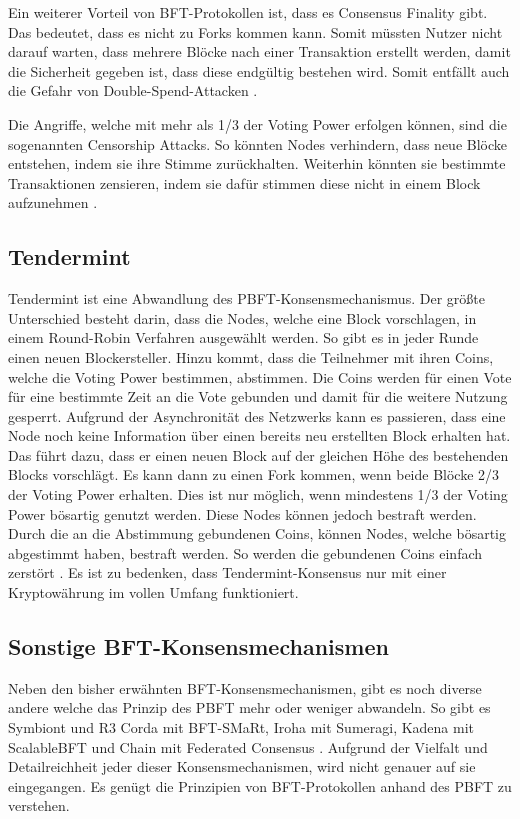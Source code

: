 Ein weiterer Vorteil von BFT-Protokollen ist, dass es Consensus Finality gibt. Das bedeutet, dass es nicht zu Forks kommen kann. Somit müssten Nutzer nicht darauf warten, dass mehrere Blöcke nach einer Transaktion erstellt werden, damit die Sicherheit gegeben ist, dass diese endgültig bestehen wird. Somit entfällt auch die Gefahr von Double-Spend-Attacken \cite{Vukolicquestscalableblockchain2015}.

Die Angriffe, welche mit mehr als 1/3 der Voting Power erfolgen können, sind die sogenannten Censorship Attacks. So könnten Nodes verhindern, dass neue Blöcke entstehen, indem sie ihre Stimme zurückhalten. Weiterhin könnten sie bestimmte Transaktionen zensieren, indem sie dafür stimmen diese nicht in einem Block aufzunehmen \cite{TendermintTeamTendermintGithubRepository2018}.

\subsection{Tendermint}
Tendermint ist eine Abwandlung des PBFT-Konsensmechanismus. Der größte Unterschied besteht darin, dass die Nodes, welche eine Block vorschlagen, in einem Round-Robin Verfahren ausgewählt werden. So gibt es in jeder Runde einen neuen Blockersteller. Hinzu kommt, dass die Teilnehmer mit ihren Coins, welche die Voting Power bestimmen, abstimmen. Die Coins werden für einen Vote für eine bestimmte Zeit an die Vote gebunden und damit für die weitere Nutzung gesperrt. Aufgrund der Asynchronität des Netzwerks kann es passieren, dass eine Node noch keine Information über einen bereits neu erstellten Block erhalten hat. Das führt dazu, dass er einen neuen Block auf der gleichen Höhe des bestehenden Blocks vorschlägt. Es kann dann zu einen Fork kommen, wenn beide Blöcke 2/3 der Voting Power erhalten. Dies ist nur möglich, wenn mindestens 1/3 der Voting Power bösartig genutzt werden. Diese Nodes können jedoch bestraft werden. Durch die an die Abstimmung gebundenen Coins, können Nodes, welche bösartig abgestimmt haben, bestraft werden. So werden die gebundenen Coins einfach zerstört \cite{KwonTendermintConsensusmining2014}\cite{BuchmanTendermintByzantineFault2016}. Es ist zu bedenken, dass Tendermint-Konsensus nur mit einer Kryptowährung im vollen Umfang funktioniert.

\subsection{Sonstige BFT-Konsensmechanismen}
Neben den bisher erwähnten BFT-Konsensmechanismen, gibt es noch diverse andere welche das Prinzip des PBFT mehr oder weniger abwandeln. So gibt es Symbiont und R3 Corda mit BFT-SMaRt, Iroha mit Sumeragi, Kadena mit ScalableBFT und Chain mit Federated Consensus \cite{CachinBlockchainConsensusProtocols2017}. Aufgrund der Vielfalt und Detailreichheit jeder dieser Konsensmechanismen, wird nicht genauer auf sie eingegangen. Es genügt die Prinzipien von BFT-Protokollen anhand des PBFT zu verstehen.

